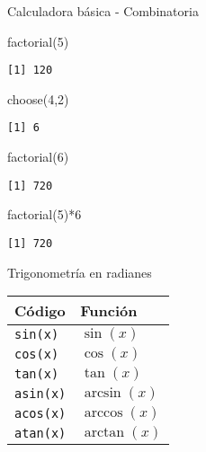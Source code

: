 \documentclass[
  ignorenonframetext,
]{beamer}
\newenvironment{Shaded}{\begin{snugshade}}{\end{snugshade}}
\newcommand{\DecValTok}[1]{\textcolor[rgb]{0.00,0.00,0.81}{#1}}
\newcommand{\FunctionTok}[1]{\textcolor[rgb]{0.00,0.00,0.00}{#1}}
\newcommand{\NormalTok}[1]{#1}
\newcommand{\SpecialCharTok}[1]{\textcolor[rgb]{0.00,0.00,0.00}{#1}}
\begin{document}
\begin{frame}[fragile]{Calculadora básica - Combinatoria}
\protect\hypertarget{calculadora-buxe1sica---combinatoria-3}{}
\begin{Shaded}
\begin{Highlighting}[]
\FunctionTok{factorial}\NormalTok{(}\DecValTok{5}\NormalTok{)}
\end{Highlighting}
\end{Shaded}

\begin{verbatim}
[1] 120
\end{verbatim}

\begin{Shaded}
\begin{Highlighting}[]
\FunctionTok{choose}\NormalTok{(}\DecValTok{4}\NormalTok{,}\DecValTok{2}\NormalTok{)}
\end{Highlighting}
\end{Shaded}

\begin{verbatim}
[1] 6
\end{verbatim}

\begin{Shaded}
\begin{Highlighting}[]
\FunctionTok{factorial}\NormalTok{(}\DecValTok{6}\NormalTok{)}
\end{Highlighting}
\end{Shaded}

\begin{verbatim}
[1] 720
\end{verbatim}

\begin{Shaded}
\begin{Highlighting}[]
\FunctionTok{factorial}\NormalTok{(}\DecValTok{5}\NormalTok{)}\SpecialCharTok{*}\DecValTok{6}
\end{Highlighting}
\end{Shaded}

\begin{verbatim}
[1] 720
\end{verbatim}
\end{frame}

\begin{frame}[fragile]{Trigonometría en radianes}
\protect\hypertarget{trigonometruxeda-en-radianes}{}
\begin{longtable}[]{@{}ll@{}}
\toprule
Código & Función \\
\midrule
\endhead
\texttt{sin(x)} & \(\sin(x)\) \\
\texttt{cos(x)} & \(\cos(x)\) \\
\texttt{tan(x)} & \(\tan(x)\) \\
\texttt{asin(x)} & \(\arcsin(x)\) \\
\texttt{acos(x)} & \(\arccos(x)\) \\
\texttt{atan(x)} & \(\arctan(x)\) \\
\bottomrule
\end{longtable}
\end{frame}
\end{document}
